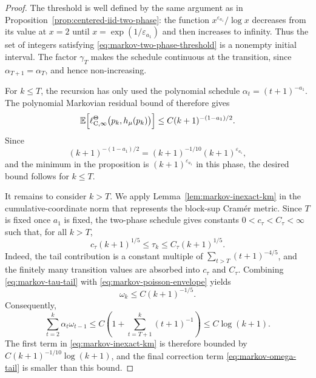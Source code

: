 \documentclass{article}
\newcommand{\E}{\mathbb{E}}
\begin{document}
\begin{proof}
The threshold is well defined by the same argument as in Proposition~\ref{prop:centered-iid-two-phase}: the function $x^{\varepsilon_{a_1}}/\log x$ decreases from its value at $x=2$ until $x=\exp(1/\varepsilon_{a_1})$ and then increases to infinity. Thus the set of integers satisfying \eqref{eq:markov-two-phase-threshold} is a nonempty initial interval. The factor $\gamma_T$ makes the schedule continuous at the transition, since $\alpha_{T+1}=\alpha_T$, and hence non-increasing.

For $k\le T$, the recursion has only used the polynomial schedule $\alpha_t=(t+1)^{-a_1}$. The polynomial Markovian residual bound of \citet[Theorem~3.1]{blaser2026asymptotic} therefore gives
\begin{equation}
\E\Bigl[\ell^\Theta_{\mathrm C,\infty}\bigl(p_k,h_\mu(p_k)\bigr)\Bigr] \le C(k+1)^{-(1-a_1)/2}.
\end{equation}
Since
\begin{equation}
(k+1)^{-(1-a_1)/2} =(k+1)^{-1/10}(k+1)^{\varepsilon_{a_1}},
\end{equation}
and the minimum in the proposition is $(k+1)^{\varepsilon_{a_1}}$ in this phase, the desired bound follows for $k\le T$.

It remains to consider $k>T$. We apply Lemma~\ref{lem:markov-inexact-km} in the cumulative-coordinate norm that represents the block-sup Cram\'er metric. Since $T$ is fixed once $a_1$ is fixed, the two-phase schedule gives constants $0<c_\tau<C_\tau<\infty$ such that, for all $k>T$,
\begin{equation}\label{eq:markov-tau-tail}
c_\tau(k+1)^{1/5}\le \tau_k\le C_\tau(k+1)^{1/5}.
\end{equation}
Indeed, the tail contribution is a constant multiple of $\sum_{t>T}(t+1)^{-4/5}$, and the finitely many transition values are absorbed into $c_\tau$ and $C_\tau$. Combining \eqref{eq:markov-tau-tail} with \eqref{eq:markov-poisson-envelope} yields
\begin{equation}\label{eq:markov-omega-tail}
\omega_k\le C(k+1)^{-1/5}.
\end{equation}
Consequently,
\begin{equation}\label{eq:markov-first-error-sum}
\sum_{t=2}^k \alpha_t\omega_{t-1} \le C\left(1+\sum_{t=T+1}^k (t+1)^{-1}\right) \le C\log(k+1).
\end{equation}
The first term in \eqref{eq:markov-inexact-km} is therefore bounded by $C(k+1)^{-1/10}\log(k+1)$, and the final correction term \eqref{eq:markov-omega-tail} is smaller than this bound.


\end{proof}
\end{document}
